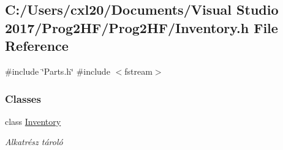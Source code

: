 \subsection{C\+:/\+Users/cxl20/\+Documents/\+Visual Studio 2017/\+Prog2\+H\+F/\+Prog2\+H\+F/\+Inventory.h File Reference}
\label{_inventory_8h}
{\ttfamily \#include \char`\"{}Parts.\+h\char`\"{}}\newline
{\ttfamily \#include $<$fstream$>$}\newline
\subsubsection*{Classes}
\begin{DoxyCompactItemize}
\item 
class \mbox{\hyperlink{class_inventory}{Inventory}}
\begin{DoxyCompactList}\small\item\em Alkatrész tároló \end{DoxyCompactList}\end{DoxyCompactItemize}
